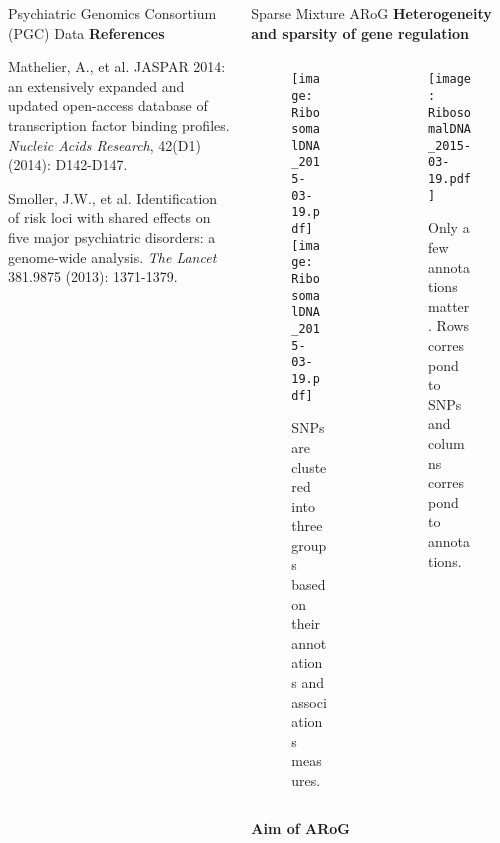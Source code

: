 \documentclass[final]{beamer}
\newcommand{\bi}{\begin{itemize}}
\newcommand{\ei}{\end{itemize}}
\begin{document}
\begin{frame}{}
\begin{columns}[t]
\begin{column}{1\linewidth}
\begin{columns}
\begin{column}{.38\textwidth}
\begin{block}{Psychiatric Genomics Consortium (PGC) Data}
{\textbf{References}}
\centering
\bi
{\footnotesize
\item Mathelier, A., et al. JASPAR 2014: an extensively expanded and updated open-access database of transcription factor binding profiles. \textit{Nucleic Acids Research}, 42(D1) (2014): D142-D147.
\item Smoller, J.W., et al. Identification of risk loci with shared effects on five major psychiatric disorders: a genome-wide analysis. \textit{The Lancet} 381.9875 (2013): 1371-1379.}
\ei



\end{block}
 \end{column}

            \begin{column}{.26\textwidth}
        \begin{block}{Sparse Mixture ARoG}
                                  {\color{orange!100} \textbf{Heterogeneity and sparsity of gene regulation}}
			\centering
\begin{center}
      \begin{columns}
            \begin{column}{.47\textwidth}
\begin{figure}
\texttt{[image: RibosomalDNA\_2015-03-19.pdf]}%
\texttt{[image: RibosomalDNA\_2015-03-19.pdf]}
\caption{{\footnotesize SNPs are clustered into three groups based on their annotations and associations measures.}}
  \end{figure}
  \end{column}
            \begin{column}{.41\textwidth}
\begin{figure}  
\texttt{[image: RibosomalDNA\_2015-03-19.pdf]}
  \caption{{\footnotesize Only a few annotations matter. Rows correspond to SNPs and columns correspond to annotations.}}
  \end{figure}
    \end{column}
\end{columns}
\end{center}

{\color{orange!100} \textbf{Aim of ARoG}}
\begin{center}


\end{center}
\end{block}
\end{column}
\end{columns}
\end{column}
\end{columns}
\end{frame}
\end{document}
